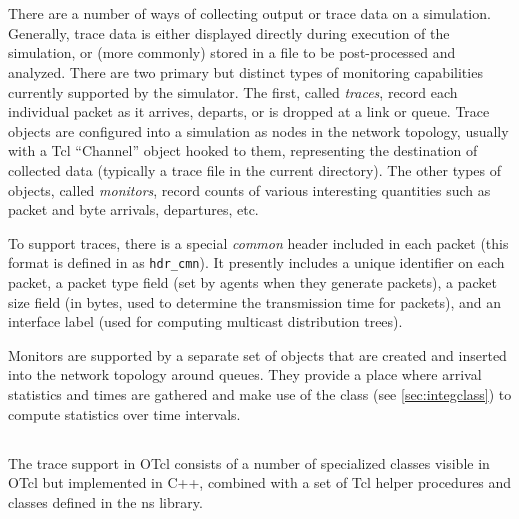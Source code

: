 %
%
\section{}

There are a number of ways of collecting output or
trace data on a simulation.
Generally, trace data is either displayed directly during execution
of the simulation, or (more commonly) stored in a file to be
post-processed and analyzed.
There are two primary but distinct types of monitoring capabilities
currently supported by the simulator.
The first, called {\em traces}, record each individual packet
as it arrives, departs, or is dropped at a link or queue.
Trace objects are configured into a simulation as nodes in the
network topology, usually with a Tcl ``Channel'' object
hooked to them, representing the destination of collected data
(typically a trace file in the current directory).
The other types of objects, called {\em monitors}, record counts
of various interesting quantities such as packet and byte arrivals,
departures, etc.

To support traces, there is a special {\em common} header
included in each packet (this format is defined in 
as {\tt hdr\_cmn}).
It presently includes a unique identifier on each packet, a
packet type field (set by agents when they generate packets),
a packet size field (in bytes, used to determine the transmission
time for packets), and an interface label (used for computing
multicast distribution trees).

Monitors are supported by a separate
set of objects that are created and inserted into the network topology
around queues.
They provide a place where
arrival statistics and times are gathered and make
use of the  class (see \ref{sec:integclass}) to
compute statistics over time intervals.

\subsection{}

The trace support in OTcl consists of a number of specialized
classes visible in OTcl but implemented in C++, combined
with a set of Tcl helper procedures and classes defined in the ns library.

